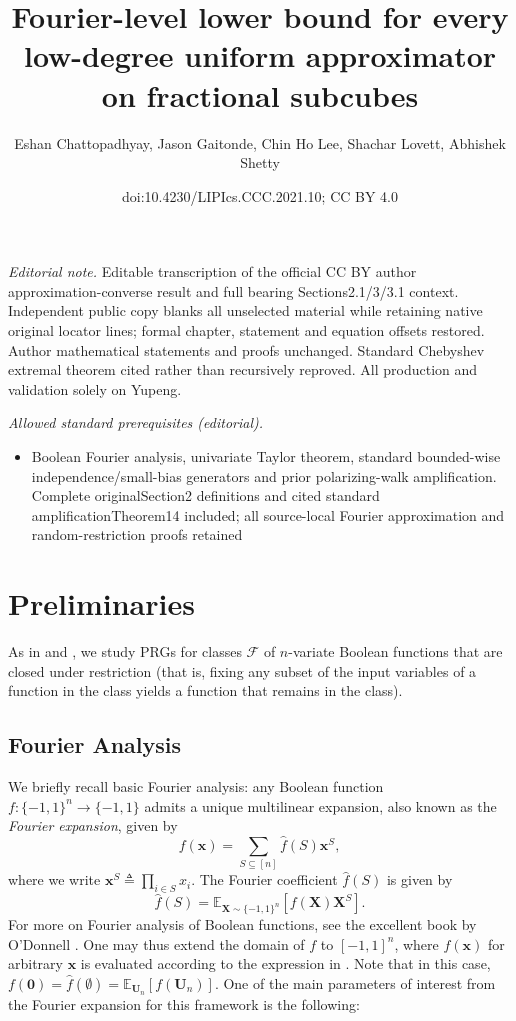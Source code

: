 \documentclass[10pt,a4paper]{article}
\title{Fourier-level lower bound for every low-degree uniform approximator on fractional subcubes}
\author{Eshan Chattopadhyay, Jason Gaitonde, Chin Ho Lee, Shachar Lovett, Abhishek Shetty}
\date{doi:10.4230/LIPIcs.CCC.2021.10; CC BY 4.0}
\theoremstyle{definition}
\begin{document}
\maketitle
\noindent\textit{Editorial note.} Editable transcription of the official CC BY author approximation-converse result and full bearing Sections2.1/3/3.1 context. Independent public copy blanks all unselected material while retaining native original locator lines; formal chapter, statement and equation offsets restored. Author mathematical statements and proofs unchanged. Standard Chebyshev extremal theorem cited rather than recursively reproved. All production and validation solely on Yupeng.\par\medskip
\noindent\textit{Allowed standard prerequisites (editorial).}\begin{itemize}
\item Boolean Fourier analysis, univariate Taylor theorem, standard bounded-wise independence/small-bias generators and prior polarizing-walk amplification. Complete originalSection2 definitions and cited standard amplificationTheorem14 included; all source-local Fourier approximation and random-restriction proofs retained
\end{itemize}\medskip
\setcounter{section}{1}\setcounter{theorem}{6}\setcounter{equation}{1}\section{Preliminaries}
\label{sec:preliminaries}
As in \cite{CHHL} and \cite{CHLT}, we study PRGs for classes $\mathcal{F}$ of $n$-variate Boolean functions that are closed under restriction (that is, fixing any subset of the input variables of a function in the class yields a function that remains in the class). 


\subsection{Fourier Analysis} \label{subsec:fourier}
We briefly recall basic Fourier analysis: any Boolean function $f:\{-1,1\}^n \to \{-1,1\}$ admits a unique multilinear expansion, also known as the \emph{Fourier expansion}, given by 
\begin{equation}
\label{eq:fourierexpansion}
    f(\mathbf{x})=\sum_{S\subseteq [n]} \hat{f}(S)\mathbf{x}^S,
\end{equation}
where we write $\mathbf{x}^S\triangleq \prod_{i\in S} x_i$. The   Fourier coefficient $\hat{f}(S)$ is given by
\begin{equation*}
    \hat{f}(S)=\mathbb{E}_{\mathbf{X}\sim \{-1,1\}^n}[f(\mathbf{X})\mathbf{X}^S].
\end{equation*}
For more on Fourier analysis of Boolean functions, see the excellent book by O'Donnell \cite{ODonnelBook}. One may thus extend the domain of $f$ to $[-1,1]^n$, where $f(\mathbf{x})$ for arbitrary $\mathbf{x}$ is evaluated according to the expression in . Note that in this case, $f(\mathbf{0})=\hat{f}(\emptyset)=\mathbb{E}_{\mathbf{U}_n}[f(\mathbf{U}_n)]$. One of the main parameters of interest from the Fourier expansion for this framework is the following:
\end{document}
